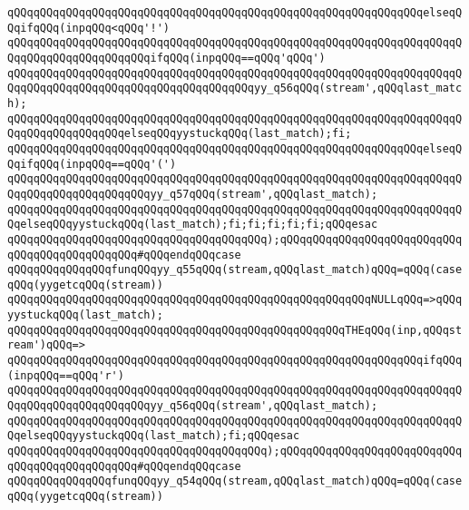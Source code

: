 \verb|qQQqqQQqqQQqqQQqqQQqqQQqqQQqqQQqqQQqqQQqqQQqqQQqqQQqqQQqqQQqqQQqelseqQQqifqQQq(inpqQQq<qQQq'!')|\newline
\verb|qQQqqQQqqQQqqQQqqQQqqQQqqQQqqQQqqQQqqQQqqQQqqQQqqQQqqQQqqQQqqQQqqQQqqQQqqQQqqQQqqQQqqQQqqQQqifqQQq(inpqQQq==qQQq'qQQq')|\newline
\verb|qQQqqQQqqQQqqQQqqQQqqQQqqQQqqQQqqQQqqQQqqQQqqQQqqQQqqQQqqQQqqQQqqQQqqQQqqQQqqQQqqQQqqQQqqQQqqQQqqQQqqQQqqQQqyy_q56qQQq(stream',qQQqlast_match);|\newline
\verb|qQQqqQQqqQQqqQQqqQQqqQQqqQQqqQQqqQQqqQQqqQQqqQQqqQQqqQQqqQQqqQQqqQQqqQQqqQQqqQQqqQQqqQQqelseqQQqyystuckqQQq(last_match);fi;|\newline
\verb|qQQqqQQqqQQqqQQqqQQqqQQqqQQqqQQqqQQqqQQqqQQqqQQqqQQqqQQqqQQqqQQqelseqQQqifqQQq(inpqQQq==qQQq'(')|\newline
\verb|qQQqqQQqqQQqqQQqqQQqqQQqqQQqqQQqqQQqqQQqqQQqqQQqqQQqqQQqqQQqqQQqqQQqqQQqqQQqqQQqqQQqqQQqqQQqyy_q57qQQq(stream',qQQqlast_match);|\newline
\verb|qQQqqQQqqQQqqQQqqQQqqQQqqQQqqQQqqQQqqQQqqQQqqQQqqQQqqQQqqQQqqQQqqQQqqQQqelseqQQqyystuckqQQq(last_match);fi;fi;fi;fi;fi;qQQqesac|\newline
\verb|qQQqqQQqqQQqqQQqqQQqqQQqqQQqqQQqqQQqqQQq);qQQqqQQqqQQqqQQqqQQqqQQqqQQqqQQqqQQqqQQqqQQqqQQq#qQQqendqQQqcase|\newline
\verb|qQQqqQQqqQQqqQQqfunqQQqyy_q55qQQq(stream,qQQqlast_match)qQQq=qQQq(caseqQQq(yygetcqQQq(stream))|\newline
\verb|qQQqqQQqqQQqqQQqqQQqqQQqqQQqqQQqqQQqqQQqqQQqqQQqqQQqqQQqNULLqQQq=>qQQqyystuckqQQq(last_match);|\newline
\verb|qQQqqQQqqQQqqQQqqQQqqQQqqQQqqQQqqQQqqQQqqQQqqQQqqQQqTHEqQQq(inp,qQQqstream')qQQq=>|\newline
\verb|qQQqqQQqqQQqqQQqqQQqqQQqqQQqqQQqqQQqqQQqqQQqqQQqqQQqqQQqqQQqqQQqifqQQq(inpqQQq==qQQq'r')|\newline
\verb|qQQqqQQqqQQqqQQqqQQqqQQqqQQqqQQqqQQqqQQqqQQqqQQqqQQqqQQqqQQqqQQqqQQqqQQqqQQqqQQqqQQqqQQqqQQqyy_q56qQQq(stream',qQQqlast_match);|\newline
\verb|qQQqqQQqqQQqqQQqqQQqqQQqqQQqqQQqqQQqqQQqqQQqqQQqqQQqqQQqqQQqqQQqqQQqqQQqelseqQQqyystuckqQQq(last_match);fi;qQQqesac|\newline
\verb|qQQqqQQqqQQqqQQqqQQqqQQqqQQqqQQqqQQqqQQq);qQQqqQQqqQQqqQQqqQQqqQQqqQQqqQQqqQQqqQQqqQQqqQQq#qQQqendqQQqcase|\newline
\verb|qQQqqQQqqQQqqQQqfunqQQqyy_q54qQQq(stream,qQQqlast_match)qQQq=qQQq(caseqQQq(yygetcqQQq(stream))|\newline
